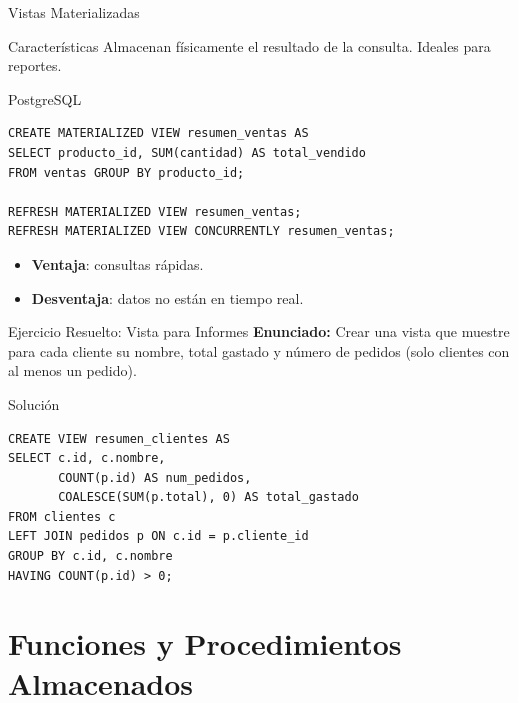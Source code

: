 \documentclass[aspectratio=169, 10pt, xcolor=table]{beamer}
\begin{document}
\begin{frame}[fragile]{Vistas Materializadas}
    \begin{block}{Características}
        Almacenan físicamente el resultado de la consulta. Ideales para reportes.
    \end{block}
    \begin{exampleblock}{PostgreSQL}
        \begin{lstlisting}
CREATE MATERIALIZED VIEW resumen_ventas AS
SELECT producto_id, SUM(cantidad) AS total_vendido
FROM ventas GROUP BY producto_id;

REFRESH MATERIALIZED VIEW resumen_ventas;
REFRESH MATERIALIZED VIEW CONCURRENTLY resumen_ventas;
        \end{lstlisting}
    \end{exampleblock}
    \begin{itemize}
        \item \textbf{Ventaja}: consultas rápidas.
        \item \textbf{Desventaja}: datos no están en tiempo real.
    \end{itemize}
\end{frame}

\begin{frame}[fragile]{Ejercicio Resuelto: Vista para Informes}
    \textbf{Enunciado:} Crear una vista que muestre para cada cliente su nombre, total gastado y número de pedidos (solo clientes con al menos un pedido).
    \begin{block}{Solución}
        \begin{lstlisting}
CREATE VIEW resumen_clientes AS
SELECT c.id, c.nombre,
       COUNT(p.id) AS num_pedidos,
       COALESCE(SUM(p.total), 0) AS total_gastado
FROM clientes c
LEFT JOIN pedidos p ON c.id = p.cliente_id
GROUP BY c.id, c.nombre
HAVING COUNT(p.id) > 0;
        \end{lstlisting}
    \end{block}
\end{frame}

\section{Funciones y Procedimientos Almacenados}
\end{document}
